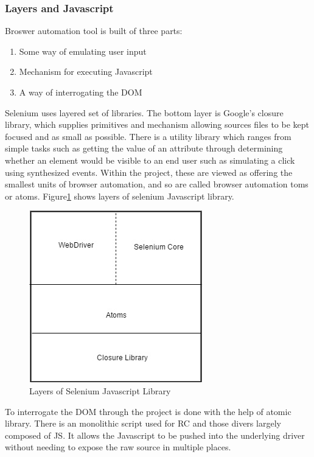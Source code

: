 \documentclass[article,type=msc,colorback,accentcolor=tud9c,twoside,11pt]{tudthesis}
\begin{document}
\subsubsection{Layers and Javascript}
Broswer automation tool is built of three parts:
\begin{enumerate}
	\item Some way of emulating user input
	\item Mechanism for executing Javascript
	\item A way of interrogating the DOM
\end{enumerate}
Selenium uses layered set of libraries. The bottom layer is Google's closure library, which supplies primitives and mechanism allowing sources files to be kept focused and as small as possible. There is a utility library which ranges from simple tasks such as getting the value of an attribute through determining whether an element would be visible to an end user such as simulating a click using synthesized events. Within the project, these are viewed as offering the smallest units of browser automation, and so are called browser automation toms or atoms. Figure\ref{fig:LayersofSeleniumJSLibrary} shows layers of selenium Javascript library.
\begin{figure}[h]
	\centering
	\includegraphics[scale=0.6]{LayersofSeleniumJSLibrary}
	\caption{Layers of Selenium Javascript Library}
	\label{fig:LayersofSeleniumJSLibrary}
\end{figure}
To interrogate the DOM through the project is done with the help of atomic library. There is an monolithic script used for RC and those divers largely composed of JS. It allows the Javascript to be pushed into the underlying driver without needing to expose the raw source in multiple places.
\end{document}
